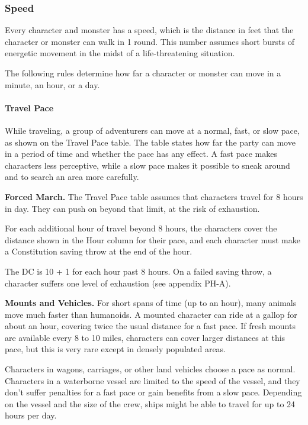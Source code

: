 \documentclass[
]{article}
\begin{document}
\hypertarget{speed}{%
\subsubsection{Speed}\label{speed}}

Every character and monster has a speed, which is the distance in feet
that the character or monster can walk in 1 round. This number assumes
short bursts of energetic movement in the midst of a life-threatening
situation.

The following rules determine how far a character or monster can move in
a minute, an hour, or a day.

\hypertarget{travel-pace}{%
\paragraph{Travel Pace}\label{travel-pace}}

While traveling, a group of adventurers can move at a normal, fast, or
slow pace, as shown on the Travel Pace table. The table states how far
the party can move in a period of time and whether the pace has any
effect. A fast pace makes characters less perceptive, while a slow pace
makes it possible to sneak around and to search an area more carefully.

\textbf{Forced March.} The Travel Pace table assumes that characters
travel for 8 hours in day. They can push on beyond that limit, at the
risk of exhaustion.

For each additional hour of travel beyond 8 hours, the characters cover
the distance shown in the Hour column for their pace, and each character
must make a Constitution saving throw at the end of the hour.

The DC is 10 + 1 for each hour past 8 hours. On a failed saving throw, a
character suffers one level of exhaustion (see appendix PH-A).

\textbf{Mounts and Vehicles.} For short spans of time (up to an hour),
many animals move much faster than humanoids. A mounted character can
ride at a gallop for about an hour, covering twice the usual distance
for a fast pace. If fresh mounts are available every 8 to 10 miles,
characters can cover larger distances at this pace, but this is very
rare except in densely populated areas.

Characters in wagons, carriages, or other land vehicles choose a pace as
normal. Characters in a waterborne vessel are limited to the speed of
the vessel, and they don't suffer penalties for a fast pace or gain
benefits from a slow pace. Depending on the vessel and the size of the
crew, ships might be able to travel for up to 24 hours per day.
\end{document}
